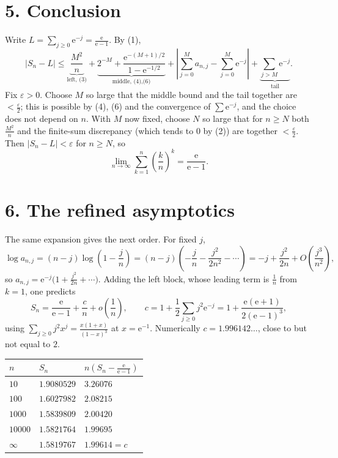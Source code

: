 \documentclass[12pt]{article}
\newcommand{\e}{\mathrm{e}}
\newcommand{\Sn}{S_n}
\begin{document}
\section*{5. Conclusion}

Write \(L=\sum_{j\ge0}\e^{-j}=\frac{\e}{\e-1}\). By (1),
\[
\left|\Sn-L\right|
\le\underbrace{\frac{M^2}{n}}_{\text{left, (3)}}
+\underbrace{2^{-M}+\frac{\e^{-(M+1)/2}}{1-\e^{-1/2}}}_{\text{middle, (4),(6)}}
+\left|\sum_{j=0}^{M}a_{n,j}-\sum_{j=0}^{M}\e^{-j}\right|
+\underbrace{\sum_{j>M}\e^{-j}}_{\text{tail}} .
\]
Fix \(\varepsilon>0\). Choose \(M\) so large that the middle bound and the
tail together are \(<\frac\varepsilon2\); this is possible by (4), (6)
and the convergence of \(\sum\e^{-j}\), and the choice does not depend on
\(n\). With \(M\) now fixed, choose \(N\) so large that for \(n\ge N\)
both \(\frac{M^2}{n}\) and the finite-sum discrepancy (which tends to
\(0\) by (2)) are together \(<\frac\varepsilon2\). Then
\(|\Sn-L|<\varepsilon\) for \(n\ge N\), so
\[
\boxed{\displaystyle
\lim_{n\to\infty}\sum_{k=1}^{n}\left(\frac kn\right)^k
=\frac{\e}{\e-1}.}
\]

\section*{6. The refined asymptotics}

The same expansion gives the next order. For fixed \(j\),
\[
\log a_{n,j}=(n-j)\log\left(1-\frac jn\right)
=(n-j)\left(-\frac jn-\frac{j^2}{2n^2}-\cdots\right)
=-j+\frac{j^2}{2n}+O\!\left(\frac{j^3}{n^2}\right),
\]
so \(a_{n,j}=\e^{-j}\bigl(1+\frac{j^2}{2n}+\cdots\bigr)\). Adding the
left block, whose leading term is \(\frac1n\) from \(k=1\), one predicts
\[
\Sn=\frac{\e}{\e-1}+\frac{c}{n}+o\!\left(\frac1n\right),
\qquad
c=1+\frac12\sum_{j\ge0}j^2\e^{-j}
=1+\frac{\e(\e+1)}{2(\e-1)^3},
\tag{7}
\]
using \(\sum_{j\ge0}j^2x^j=\frac{x(1+x)}{(1-x)^3}\) at \(x=\e^{-1}\).
Numerically \(c=1.996142\ldots\), close to but not equal to \(2\).

\begin{center}
\small
\renewcommand{\arraystretch}{1.35}
\begin{tabularx}{0.9\textwidth}{@{}lXX@{}}
\toprule
\(n\) & \(\Sn\) & \(n\left(\Sn-\frac{\e}{\e-1}\right)\) \\
\midrule
\(10\)     & \(1.9080529\) & \(3.26076\) \\
\(100\)    & \(1.6027982\) & \(2.08215\) \\
\(1000\)   & \(1.5839809\) & \(2.00420\) \\
\(10000\)  & \(1.5821764\) & \(1.99695\) \\
\midrule
\(\infty\) & \(1.5819767\) & \(1.99614=c\) \\
\bottomrule
\end{tabularx}
\end{center}
\end{document}
